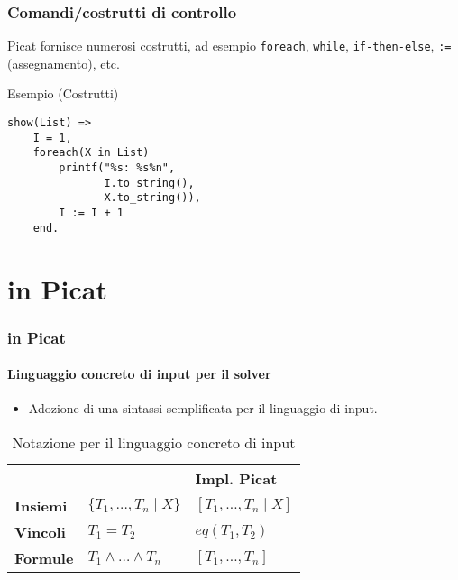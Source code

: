 \documentclass{beamer}
\begin{document}

\begin{frame}[fragile]
  \frametitle{Comandi/costrutti di controllo} 
  Picat fornisce numerosi costrutti, ad esempio
  \texttt{foreach}, \texttt{while}, \texttt{if-then-else}, \texttt{:=}
  (assegnamento), etc.
  \begin{exampleblock}{Esempio (Costrutti)}
\begin{verbatim}
show(List) =>
    I = 1,
    foreach(X in List)
        printf("%s: %s%n", 
               I.to_string(), 
               X.to_string()),
        I := I + 1
    end.
\end{verbatim}
  \end{exampleblock}
\end{frame}


\section{\lset{} in Picat}

\begin{frame}
  \frametitle{\lset{} in Picat}
  \framesubtitle{Linguaggio concreto di input per il solver}
  \begin{itemize}
  \item Adozione di una sintassi semplificata per il linguaggio di input.
  \end{itemize}
  \begin{table}
    \begin{tabular}{l l l}
      \toprule
      & \textbf{\lset{}} & \textbf{Impl. Picat}\\
      \midrule
      \textbf{Insiemi} & $\{T_1, \ldots, T_n \mid X\}$ & $[T_1, \ldots, T_n \mid X]$ \\
      \textbf{Vincoli} & $T_1 = T_2$ & $eq(T_1, T_2)$ \\
      \textbf{Formule} & $T_1 \land \ldots \land T_n$ & $[T_1, \ldots, T_n]$ \\
      \bottomrule
    \end{tabular}
    \caption{Notazione per il linguaggio concreto di input}
  \end{table}
\end{frame}

\end{document}
